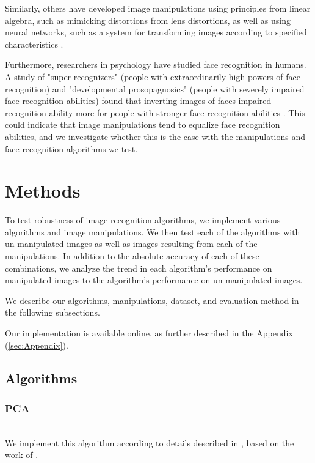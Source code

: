 \documentclass[pageno]{cos429}
\begin{document}
Similarly, others have developed image manipulations using principles from linear algebra, such as mimicking distortions from lens distortions, as well as using neural networks, such as a system for transforming images according to specified characteristics \cite{savarese_camera_2015}\cite{upchurch_deep_2016}.

Furthermore, researchers in psychology have studied face recognition in humans. A study of "super-recognizers" (people with extraordinarily high powers of face recognition) and "developmental prosopagnosics" (people with severely impaired face recognition abilities) found that inverting images of faces impaired recognition ability more for people with stronger face recognition abilities \cite{russell_super-recognizers:_2009}. This could indicate that image manipulations tend to equalize face recognition abilities, and we investigate whether this is the case with the manipulations and face recognition algorithms we test.

\section{Methods}
To test robustness of image recognition algorithms, we implement various algorithms and image manipulations. We then test each of the algorithms with un-manipulated images as well as images resulting from each of the manipulations. In addition to the absolute accuracy of each of these combinations, we analyze the trend in each algorithm's performance on manipulated images to the algorithm's performance on un-manipulated images.

We describe our algorithms, manipulations, dataset, and evaluation method in the following subsections.

Our implementation is available online, as further described in the Appendix (\ref{sec:Appendix}).

\subsection{Algorithms}
\subsubsection{PCA}\hspace*{\fill} \\
We implement this algorithm according to details described in \cite{vidal_eigenfaces_2008}, based on the work of \cite{turk_eigenfaces_1991}.
\end{document}
